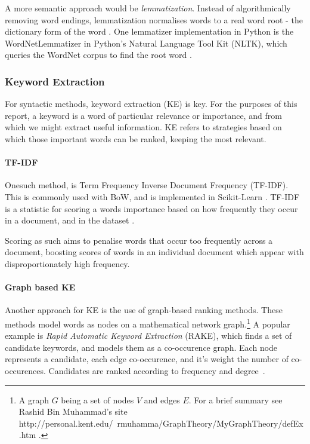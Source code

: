 A more semantic approach would be \emph{lemmatization}. Instead of algorithmically removing word endings, lemmatization 
normalises words to a real word root - the dictionary
form of the word \cite{Jayakodi2016}.  One lemmatizer implementation in Python is the WordNetLemmatizer in Python's
Natural Language Tool Kit (NLTK), which queries the WordNet corpus to find the root word 
\cite{StevenBirdEwanKlein2009, princetonuniversity_2010}. 
 
\subsubsection{Keyword Extraction}\label{sssec:kwe}
For syntactic methods, keyword extraction (KE) is key.  For the purposes of this report, a keyword is a word of particular
relevance or importance, and from which we might extract useful information.  KE refers to strategies
based on which those important words can be ranked, keeping the most relevant.

\paragraph{TF-IDF}\label{ssec:tfidf}

Onesuch method, is Term Frequency Inverse Document Frequency (TF-IDF). This is commonly used with BoW, and is 
implemented in Scikit-Learn \cite{Barupal2011}.  TF-IDF is a statistic for scoring a words importance based on
how frequently they occur in a document, and in the dataset \cite{Ramos2003}.

Scoring as such aims to penalise words that occur too frequently across a document, boosting scores of words in an 
individual document which appear with disproportionately high frequency.

\paragraph{Graph based KE}\label{sssec:gbkwe}

Another approach for KE is the use of graph-based ranking methods.  These methods model words as
nodes on a mathematical network graph.\footnote{A graph $G$ being a set of nodes $V$ and edges $E$.  For a brief 
summary see Rashid Bin Muhammad's site http://personal.kent.edu/~rmuhamma/GraphTheory/MyGraphTheory/defEx.htm
\cite{muhammad}.}  A popular example is \emph{Rapid Automatic Keyword Extraction} (RAKE), which
finds a set of candidate keywords, and models them as a co-occurence graph.  
Each node represents a candidate, each edge co-occurence, and it's weight the number of co-occurences.  
Candidates are ranked according to frequency and degree~\cite{Rose2010}.

